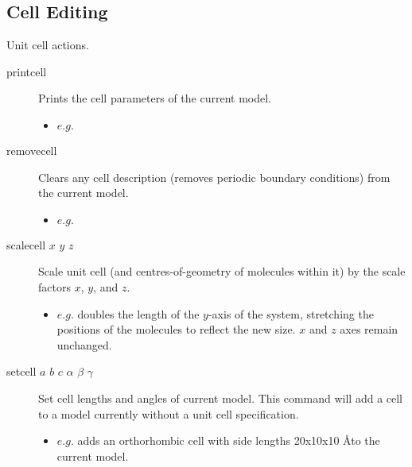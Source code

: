 \subsection{Cell Editing}
Unit cell actions.\\
\begin{description}

	\item[printcell\its] Prints the cell parameters of the current model.
	\begin{itemize}
		\item $e.g.$ 
	\end{itemize}

	\item[removecell\its] Clears any cell description (removes periodic boundary conditions) from the current model.
	\begin{itemize}
		\item $e.g.$ 
	\end{itemize}

	\item[scalecell $x$ $y$ $z$\its] Scale unit cell (and centres-of-geometry of molecules within it) by the scale factors $x$, $y$, and $z$.
	\begin{itemize}
		\item $e.g.$  doubles the length of the $y$-axis of the system, stretching the positions of the molecules to reflect the new size. $x$ and $z$ axes remain unchanged.
	\end{itemize}

	\item[setcell $a$ $b$ $c$ $\alpha$ $\beta$ $\gamma$\its] Set cell lengths and angles of current model. This command will add a cell to a model currently without a unit cell specification.
	\begin{itemize}
		\item $e.g.$  adds an orthorhombic cell with side lengths 20x10x10 \AA to the current model.
	\end{itemize}

\end{description}


